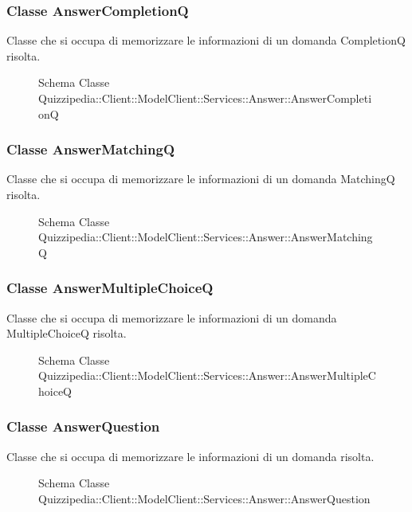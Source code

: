\subsubsection{Classe AnswerCompletionQ}
Classe che si occupa di memorizzare le informazioni di un domanda CompletionQ risolta.
\begin{figure}[H]
\centering
\noindent{}
\caption[Schema Classe AnswerCompletionQ]{Schema Classe Quizzipedia::Client::ModelClient::Services::Answer::AnswerCompletionQ}
\end{figure}
\subsubsection{Classe AnswerMatchingQ}
Classe che si occupa di memorizzare le informazioni di un domanda MatchingQ risolta.
\begin{figure}[H]
\centering
\noindent{}
\caption[Schema Classe AnswerMatchingQ]{Schema Classe Quizzipedia::Client::ModelClient::Services::Answer::AnswerMatchingQ}
\end{figure}
\subsubsection{Classe AnswerMultipleChoiceQ}
Classe che si occupa di memorizzare le informazioni di un domanda MultipleChoiceQ risolta.
\begin{figure}[H]
\centering
\noindent{}
\caption[Schema Classe AnswerMultipleChoiceQ]{Schema Classe Quizzipedia::Client::ModelClient::Services::Answer::AnswerMultipleChoiceQ}
\end{figure}
\subsubsection{Classe AnswerQuestion}
Classe che si occupa di memorizzare le informazioni di un domanda risolta.
\begin{figure}[H]
\centering
\noindent{}
\caption[Schema Classe AnswerQuestion]{Schema Classe Quizzipedia::Client::ModelClient::Services::Answer::AnswerQuestion}
\end{figure}
